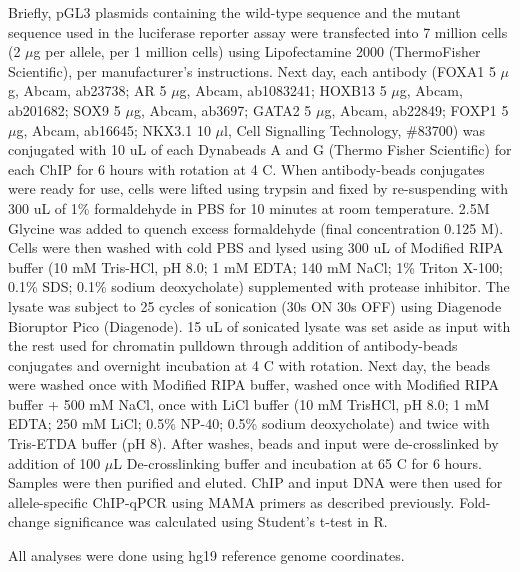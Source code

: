 Briefly, pGL3 plasmids containing the wild-type sequence and the mutant sequence used in the luciferase reporter assay were transfected into 7 million cells (2 $\mu$g per allele, per 1 million cells) using Lipofectamine 2000 (ThermoFisher Scientific), per manufacturer's instructions.
Next day, each antibody (FOXA1 5 $\mu$g, Abcam, ab23738; AR 5 $\mu$g, Abcam, ab1083241; HOXB13 5 $\mu$g, Abcam, ab201682; SOX9 5 $\mu$g, Abcam, ab3697; GATA2 5 $\mu$g, Abcam, ab22849; FOXP1 5 $\mu$g, Abcam, ab16645; NKX3.1 10 $\mu$l, Cell Signalling Technology, \#83700) was conjugated with 10 uL of each Dynabeads A and G (Thermo Fisher Scientific) for each ChIP for 6 hours with rotation at 4 \textdegree C.
When antibody-beads conjugates were ready for use, cells were lifted using trypsin and fixed by re-suspending with 300 uL of 1\% formaldehyde in PBS for 10 minutes at room temperature.
2.5M Glycine was added to quench excess formaldehyde (final concentration 0.125 M).
Cells were then washed with cold PBS and lysed using 300 uL of Modified RIPA buffer (10 mM Tris-HCl, pH 8.0; 1 mM EDTA; 140 mM NaCl; 1\% Triton X-100; 0.1\% SDS; 0.1\% sodium deoxycholate) supplemented with protease inhibitor.
The lysate was subject to 25 cycles of sonication (30s ON 30s OFF) using Diagenode Bioruptor Pico (Diagenode).
15 uL of sonicated lysate was set aside as input with the rest used for chromatin pulldown through addition of antibody-beads conjugates and overnight incubation at 4 \textdegree C with rotation.
Next day, the beads were washed once with Modified RIPA buffer, washed once with Modified RIPA buffer + 500 mM NaCl, once with LiCl buffer (10 mM TrisHCl, pH 8.0; 1 mM EDTA; 250 mM LiCl; 0.5\% NP-40; 0.5\% sodium deoxycholate) and twice with Tris-ETDA buffer (pH 8).
After washes, beads and input were de-crosslinked by addition of 100 $\mu$L De-crosslinking buffer and incubation at 65 \textdegree C for 6 hours.
Samples were then purified and eluted.
ChIP and input DNA were then used for allele-specific ChIP-qPCR using MAMA primers as described previously.
Fold-change significance was calculated using Student's t-test in R.

All analyses were done using hg19 reference genome coordinates.
